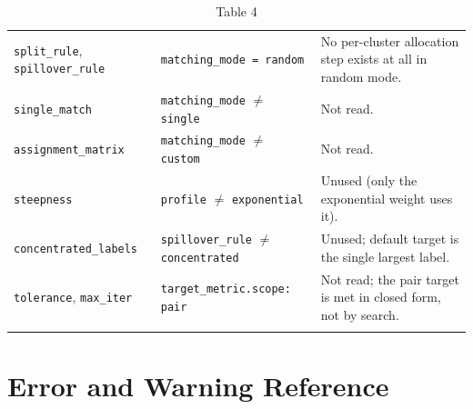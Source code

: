 \documentclass[a4paper,11pt]{article}
\begin{document}
\begin{longtable}{@{}L{4.2cm} L{5.4cm} L{6.0cm}@{}}
\texttt{split\_rule}, \texttt{spillover\_rule} & \texttt{matching\_mode = random} & No per-cluster allocation step exists at all in random mode. \\
\texttt{single\_match} & \texttt{matching\_mode} $\neq$ \texttt{single} & Not read. \\
\texttt{assignment\_matrix} & \texttt{matching\_mode} $\neq$ \texttt{custom} & Not read. \\
\texttt{steepness} & \texttt{profile} $\neq$ \texttt{exponential} & Unused (only the exponential weight uses it). \\
\texttt{concentrated\_labels} & \texttt{spillover\_rule} $\neq$ \texttt{concentrated} & Unused; default target is the single largest label. \\
\texttt{tolerance}, \texttt{max\_iter} & \texttt{target\_metric.scope: pair} & Not read; the pair target is met in closed form, not by search. \\
\bottomrule
\caption{Table 4}
\end{longtable}
\newpage
\section{Error and Warning Reference}
\footnotesize
\setlength{\tabcolsep}{4pt}
\end{document}
